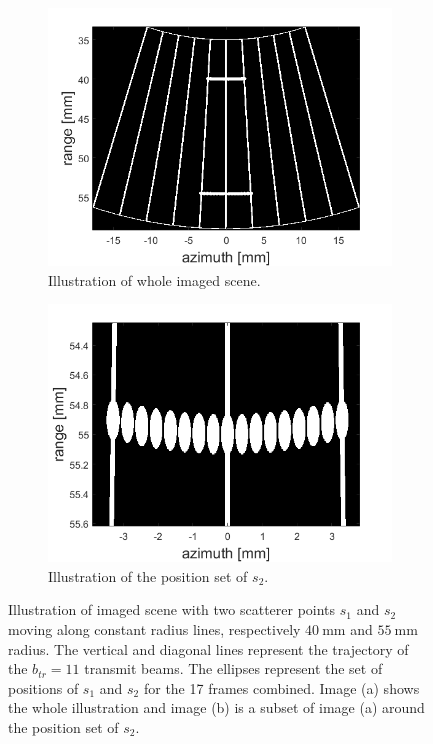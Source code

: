 \begin{figure}[ht]
    \centering
    \begin{subfigure}[t]{0.48\linewidth}
        \includegraphics[width=\linewidth]{./images/results/1/illustration_scene.png}
    \caption{Illustration of whole imaged scene.}
    \label{fig:image_illustration}
    \end{subfigure}
    \quad
    \begin{subfigure}[t]{0.48\linewidth}
        \includegraphics[width=\linewidth]{./images/results/1/zoom_55mm.png}
    \caption{Illustration of the position set of $s_2$.}
    \label{fig:image_illustration_zoom}
    \end{subfigure}
	\caption[Illustration of imaged scene with two scatterer points $s_1$ and $s_2$ moving along constant radius lines, respectively $40~$mm and $55~$mm radius.]{Illustration of imaged scene with two scatterer points $s_1$ and $s_2$ moving along constant radius lines, respectively $40~$mm and $55~$mm radius. The vertical and diagonal lines represent the trajectory of the $b_{tr} = 11$ transmit beams. The ellipses represent the set of positions of $s_1$ and $s_2$ for the 17 frames combined. Image (a) shows the whole illustration and image (b) is a subset of image (a) around the position set of $s_2$.}
	\label{fig:frames_illustration}
\end{figure}

